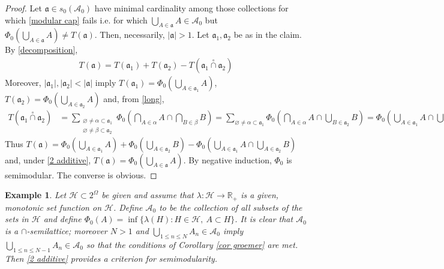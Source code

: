 \documentclass[11pt]{amsart}
\theoremstyle{plain}
\newtheorem{example}{Example}
\begin{document}
\begin{proof}
Let ${\mathfrak a}\in s_0({\mathscr{A}}_0)$ have minimal cardinality among those collections 
for which \eqref{modular cap} fails i.e. for which $\bigcup_{A\in{\mathfrak a}}A\in{\mathscr{A}}_0$
but $\Phi_0(\bigcup_{A\in{\mathfrak a}}A)\ne T({\mathfrak a})$. Then, necessarily, ${\vert {\mathfrak a}\vert}>1$.
Let ${\mathfrak a}_1,{\mathfrak a}_2$ be as in the claim. By \eqref{decomposition},
\begin{align*}
T({\mathfrak a})=T({\mathfrak a}_1)+T({\mathfrak a}_2)-T({\mathfrak a}_1{\overset\circ\cap}{\mathfrak a}_2)
\end{align*}
Moreover, ${\vert {{\mathfrak a}_1}\vert},{\vert {{\mathfrak a}_2}\vert}<{\vert {\mathfrak a}\vert}$ imply
$T({\mathfrak a}_1)=\Phi_0(\bigcup_{A\in{\mathfrak a}_1}A)$, $T({\mathfrak a}_2)=\Phi_0(\bigcup_{A\in{\mathfrak a}_2}A)$ and,
from \eqref{long},
\begin{align*}
T({\mathfrak a}_1{\overset\circ\cap}{\mathfrak a}_2)
&=
\sum_{\substack{{\varnothing}\ne\alpha\subset{\mathfrak a}_1\\{\varnothing}\ne\beta\subset{\mathfrak a}_2}}
\Phi_0\left(\bigcap_{A\in\alpha}A\cap\bigcap_{B\in\beta}B\right)
=
\sum_{{\varnothing}\ne\alpha\subset{\mathfrak a}_1}
\Phi_0\left(\bigcap_{A\in\alpha}A\cap\bigcup_{B\in{\mathfrak a}_2}B\right)
=
\Phi_0\left(\bigcup_{A\in{\mathfrak a}_1}A\cap\bigcup_{B\in{\mathfrak a}_2}B\right)
\end{align*}
Thus 
$T({\mathfrak a})=
\Phi_0\left(\bigcup_{A\in{\mathfrak a}_1}A\right)+\Phi_0\left(\bigcup_{A\in{\mathfrak a}_2}B\right)
-\Phi_0\left(\bigcup_{A\in{\mathfrak a}_1}A\cap\bigcup_{A\in{\mathfrak a}_2}B\right)
$ 
and, under \eqref{2 additive}, $T({\mathfrak a})=\Phi_0\left(\bigcup_{A\in{\mathfrak a}}A\right)$. By 
negative induction, $\Phi_0$ is semimodular. The converse is obvious.
\end{proof}

\begin{example}
\label{ex groemer}
Let $\mathscr H\subset2^\Omega$ be given and assume that $\lambda:\mathscr H\to{\mathbb{R}}_+$
is a given, monotonic set function on $\mathscr H$. Define ${\mathscr{A}}_0$ to be the collection
of all subsets of the sets in $\mathscr H$ and define
$\Phi_0(A)=\inf\{\lambda(H):H\in\mathscr H,\ A\subset H\}$. It is clear that ${\mathscr{A}}_0$ is a 
$\cap$-semilattice; moreover $N>1$ and $\bigcup_{1\le n\le N}A_n\in{\mathscr{A}}_0$ imply
$\bigcup_{1\le n\le N-1}A_n\in{\mathscr{A}}_0$ so that the conditions of Corollary \ref{cor groemer}
are met. Then \eqref{2 additive} provides a criterion for semimodularity.
\end{example}
\end{document}
